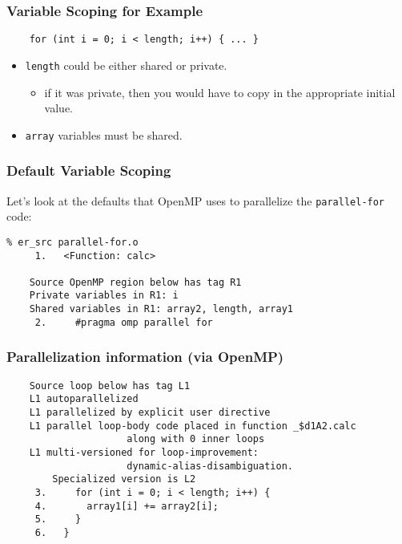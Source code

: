 \documentclass[aspectratio=43]{beamer}
\newenvironment{changemargin}[1]{%
  \begin{list}{}{%
    \setlength{\topsep}{0pt}%
    \setlength{\leftmargin}{#1}%
    \setlength{\rightmargin}{1em}
    \setlength{\listparindent}{\parindent}%
    \setlength{\itemindent}{\parindent}%
    \setlength{\parsep}{\parskip}%
  }%
  \item[]}{\end{list}}
\begin{document}
\begin{frame}[fragile]
  \frametitle{Variable Scoping for Example}

  \begin{changemargin}{2cm}

\begin{verbatim}
    for (int i = 0; i < length; i++) { ... }
\end{verbatim}

\large
  \begin{itemize}
    \item {\tt length} could be either shared or private.
    \begin{itemize}
      \item if it was private, then you would have to copy
in the appropriate initial value.
    \end{itemize}
    \item {\tt array} variables must be shared.
  \end{itemize}
  \end{changemargin}

\end{frame}


\begin{frame}[fragile]
  \frametitle{Default Variable Scoping}
  \begin{changemargin}{2cm}
Let's look at the defaults that OpenMP uses to parallelize the {\tt parallel-for} code:
\begin{lstlisting}
% er_src parallel-for.o
     1.   <Function: calc>
    
    Source OpenMP region below has tag R1
    Private variables in R1: i
    Shared variables in R1: array2, length, array1
     2.     #pragma omp parallel for
\end{lstlisting}
  \end{changemargin}

\end{frame}


\begin{frame}[fragile]
  \frametitle{Parallelization information (via OpenMP)}
\begin{lstlisting}
    Source loop below has tag L1
    L1 autoparallelized
    L1 parallelized by explicit user directive
    L1 parallel loop-body code placed in function _$d1A2.calc 
                     along with 0 inner loops
    L1 multi-versioned for loop-improvement:
                     dynamic-alias-disambiguation. 
        Specialized version is L2
     3.     for (int i = 0; i < length; i++) {
     4.       array1[i] += array2[i];
     5.     }
     6.   }
\end{lstlisting}

\end{frame}
\end{document}
